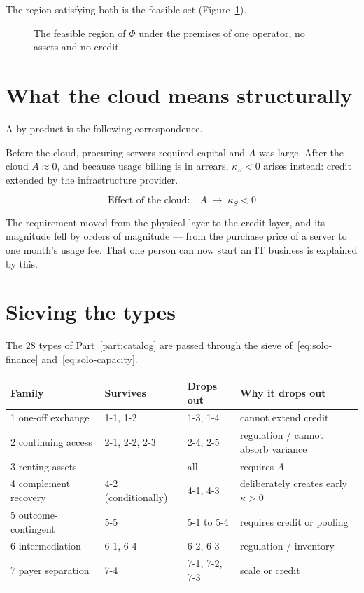 The region satisfying both is the feasible set (Figure~\ref{fig:solo-quadrant}).

\begin{figure}[htbp]
\centering
{}
\caption{The feasible region of $\Phi$ under the premises of one operator, no assets and no credit.}
\label{fig:solo-quadrant}
\end{figure}

\section{What the cloud means structurally}

A by-product is the following correspondence.

Before the cloud, procuring servers required capital and $A$ was large. After the cloud
$A\approx 0$, and because usage billing is in arrears, $\kappa_S<0$ arises instead: credit
extended by the infrastructure provider.

\begin{equation}
\text{Effect of the cloud:} \quad A \;\longrightarrow\; \kappa_S<0
\end{equation}

The requirement moved from the physical layer to the credit layer, and its magnitude fell by
orders of magnitude --- from the purchase price of a server to one month's usage fee. That
one person can now start an IT business is explained by this.

\section{Sieving the types}

The 28 types of Part~\ref{part:catalog} are passed through the sieve
of~\eqref{eq:solo-finance} and~\eqref{eq:solo-capacity}.

\begin{center}
\begin{tabularx}{\textwidth}{@{}lXXX@{}}
\toprule
Family & Survives & Drops out & Why it drops out \\
\midrule
1 one-off exchange & 1-1, 1-2 & 1-3, 1-4 & cannot extend credit \\
2 continuing access & 2-1, 2-2, 2-3 & 2-4, 2-5 & regulation / cannot absorb variance \\
3 renting assets & --- & all & requires $A$ \\
4 complement recovery & 4-2 (conditionally) & 4-1, 4-3 & deliberately creates early $\kappa>0$ \\
5 outcome-contingent & 5-5 & 5-1 to 5-4 & requires credit or pooling \\
6 intermediation & 6-1, 6-4 & 6-2, 6-3 & regulation / inventory \\
7 payer separation & 7-4 & 7-1, 7-2, 7-3 & scale or credit \\
\bottomrule
\end{tabularx}
\label{tab:solo-type-filter}
\end{center}

